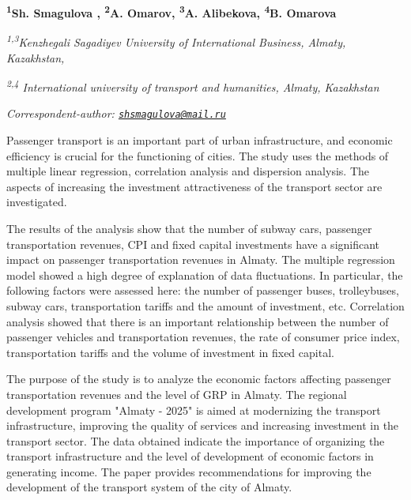 
\begin{articleheader}

{\bfseries  
\textsuperscript{1}Sh. Smagulova\textsuperscript{\envelope } ,
\textsuperscript{2}A. Omarov,
\textsuperscript{3}A. Alibekova,
\textsuperscript{4}B. Omarova}
\end{articleheader}

\begin{affiliation}
\textsuperscript{\emph{1,3}}\emph{Kenzhegali Sagadiyev University of International Business, Almaty, Kazakhstan,}

\emph{\textsuperscript{2,4} International university of transport and humanities, Almaty, Kazakhstan}

\raggedright \textsuperscript{\envelope }{\em Correspondent-author: \href{mailto:shsmagulova@mail.ru}{\nolinkurl{shsmagulova@mail.ru}}}
\end{affiliation}

Passenger transport is an important part of urban infrastructure, and
economic efficiency is crucial for the functioning of cities. The study
uses the methods of multiple linear regression, correlation analysis and
dispersion analysis. The aspects of increasing the investment
attractiveness of the transport sector are investigated.

The results of the analysis show that the number of subway cars,
passenger transportation revenues, CPI and fixed capital investments
have a significant impact on passenger transportation revenues in
Almaty. The multiple regression model showed a high degree of
explanation of data fluctuations. In particular, the following factors
were assessed here: the number of passenger buses, trolleybuses, subway
cars, transportation tariffs and the amount of investment, etc.
Correlation analysis showed that there is an important relationship
between the number of passenger vehicles and transportation revenues,
the rate of consumer price index, transportation tariffs and the volume
of investment in fixed capital.

The purpose of the study is to analyze the economic factors affecting
passenger transportation revenues and the level of GRP in Almaty. The
regional development program "Almaty - 2025" is aimed at modernizing the
transport infrastructure, improving the quality of services and
increasing investment in the transport sector. The data obtained
indicate the importance of organizing the transport infrastructure and
the level of development of economic factors in generating income. The
paper provides recommendations for improving the development of the
transport system of the city of Almaty.

